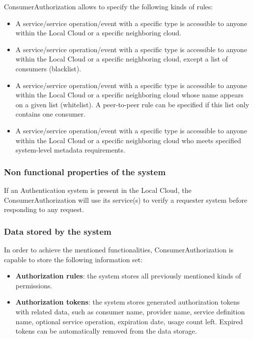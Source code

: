 \documentclass[a4paper]{arrowhead}
\begin{document}
ConsumerAuthorization allows to specify the following kinds of rules:

\begin{itemize}
    \item A service/service operation/event with a specific type is accessible to anyone within the Local Cloud or a specific neighboring cloud.
    \item A service/service operation/event with a specific type is accessible to anyone within the Local Cloud or a specific neighboring cloud, except a list of consumers (blacklist).
    \item A service/service operation/event with a specific type is accessible to anyone within the Local Cloud or a specific neighboring cloud whose name appears on a given list (whitelist). A peer-to-peer rule can be specified if this list only contains one consumer.
    \item A service/service operation/event with a specific type is accessible to anyone within the Local Cloud or a specific neighboring cloud who meets specified system-level metadata requirements.
\end{itemize}

\subsubsection {Non functional properties of the system}
If an Authentication system is present in the Local Cloud, the ConsumerAuthorization will use its service(s) to verify a requester system before responding to any request. 

\subsubsection {Data stored by the system}
In order to achieve the mentioned functionalities, ConsumerAuthorization is capable to store the following information set:

\begin{itemize}
    \item \textbf{Authorization rules}: the system stores all previously mentioned kinds of permissions.
    \item \textbf{Authorization tokens}: the system stores generated authorization tokens with related data, such as consumer name, provider name, service definition name, optional service operation, expiration date, usage count left. Expired tokens can be automatically removed from the data storage.
\end{itemize}
\end{document}
